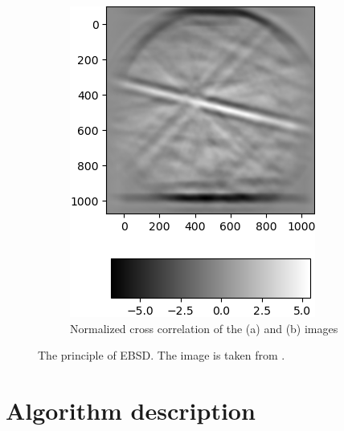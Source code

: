 \begin{figure}
\begin{subfigure}{.49\textwidth}
		\includegraphics[width=\linewidth]{img/normalized_corr}
		\caption{Normalized cross correlation of the (a) and (b) images}
		\label{2d-correlation-example-result}
	\end{subfigure}
	
	\caption{The principle of EBSD. The image is taken from \cite{correlation_example}.}
	\label{2d-correlation-example}
\end{figure}


\section{Algorithm description}



